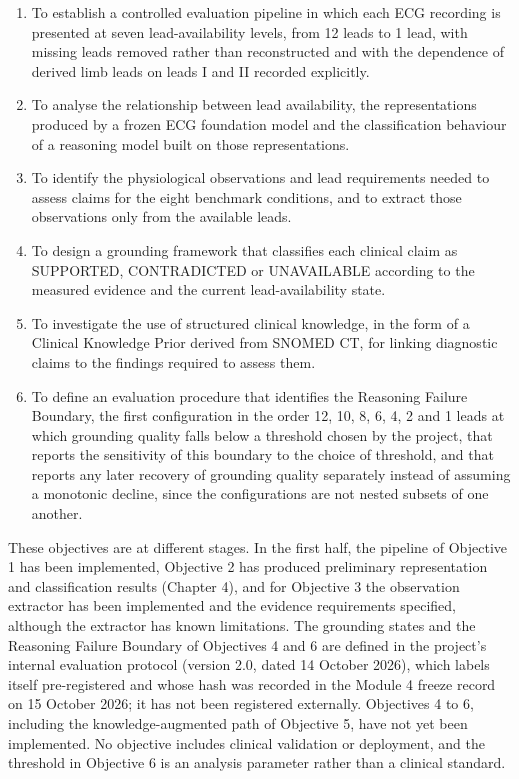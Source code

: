\begin{enumerate}
    \item To establish a controlled evaluation pipeline in which each ECG recording is presented at seven lead-availability levels, from 12 leads to 1 lead, with missing leads removed rather than reconstructed and with the dependence of derived limb leads on leads I and II recorded explicitly.
    \item To analyse the relationship between lead availability, the representations produced by a frozen ECG foundation model and the classification behaviour of a reasoning model built on those representations.
    \item To identify the physiological observations and lead requirements needed to assess claims for the eight benchmark conditions, and to extract those observations only from the available leads.
    \item To design a grounding framework that classifies each clinical claim as SUPPORTED, CONTRADICTED or UNAVAILABLE according to the measured evidence and the current lead-availability state.
    \item To investigate the use of structured clinical knowledge, in the form of a Clinical Knowledge Prior derived from SNOMED CT, for linking diagnostic claims to the findings required to assess them.
    \item To define an evaluation procedure that identifies the Reasoning Failure Boundary, the first configuration in the order 12, 10, 8, 6, 4, 2 and 1 leads at which grounding quality falls below a threshold chosen by the project, that reports the sensitivity of this boundary to the choice of threshold, and that reports any later recovery of grounding quality separately instead of assuming a monotonic decline, since the configurations are not nested subsets of one another.
\end{enumerate}

These objectives are at different stages. In the first half, the pipeline of Objective 1 has been implemented, Objective 2 has produced preliminary representation and classification results (Chapter 4), and for Objective 3 the observation extractor has been implemented and the evidence requirements specified, although the extractor has known limitations. The grounding states and the Reasoning Failure Boundary of Objectives 4 and 6 are defined in the project's internal evaluation protocol (version 2.0, dated 14 October 2026), which labels itself pre-registered and whose hash was recorded in the Module 4 freeze record on 15 October 2026; it has not been registered externally. Objectives 4 to 6, including the knowledge-augmented path of Objective 5, have not yet been implemented. No objective includes clinical validation or deployment, and the threshold in Objective 6 is an analysis parameter rather than a clinical standard.
